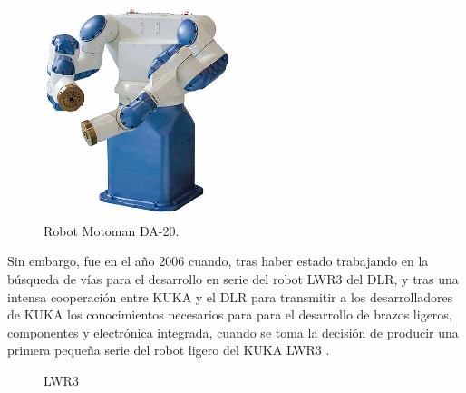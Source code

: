   \begin{figure} [h!]
    \begin{center}
      \includegraphics[width=55mm]{figs/MOTOMAN.jpg}
    \end{center}
    \caption{Robot Motoman DA-20.}
    \label{fig:MOTOMAN}
  \end{figure}
  
  \pagebreak
  
Sin embargo, fue en el año 2006 cuando, tras haber estado trabajando en la búsqueda de vías para el desarrollo en serie del robot LWR3 del DLR, y tras una intensa cooperación entre KUKA y el DLR para transmitir a los desarrolladores de KUKA los conocimientos necesarios para para el desarrollo de brazos ligeros, componentes y electrónica integrada, cuando se toma la decisión de producir una primera pequeña serie del robot ligero del KUKA LWR3 \cite{Bischoff10}.
  
  \begin{figure}[h!]
    \begin{center}
      \subcapcentertrue
      \hspace{2mm}
    \end{center}
    \caption{LWR3}
    \label{fig:Lightweight Robot (LWR)}
  \end{figure}
  
